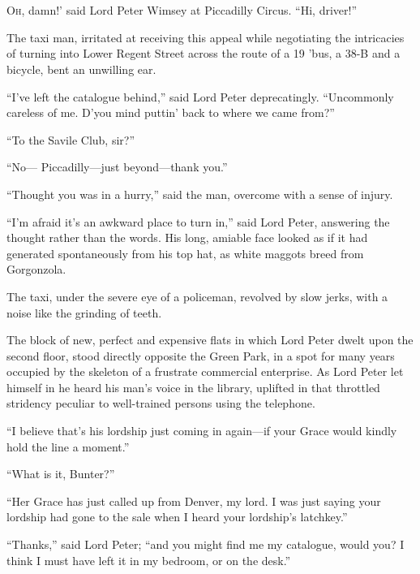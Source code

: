 \chapter[Chapter \thechapter]{}
\lettrine[lines=4,ante=‘]{O}{h}, damn!' said Lord Peter Wimsey at Piccadilly Circus. \enquote{Hi, driver!}

\zz
The taxi man, irritated at receiving this appeal while negotiating the intricacies of turning into Lower Regent Street across the route of a 19 ’bus, a 38-B and a bicycle, bent an unwilling ear.

\enquote{I’ve left the catalogue behind,} said Lord Peter deprecatingly. \enquote{Uncommonly careless of me. D’you mind puttin’ back to where we came from?}

\enquote{To the Savile Club, sir?}

\enquote{No\allowbreak--- Piccadilly\allowbreak---\allowbreak just beyond\allowbreak---\allowbreak thank you.}

\enquote{Thought you was in a hurry,} said the man, overcome with a sense of injury.

\enquote{I’m afraid it’s an awkward place to turn in,} said Lord Peter, answering the thought rather than the words. His long, amiable face looked as if it had generated spontaneously from his top hat, as white maggots breed from Gorgonzola.

The taxi, under the severe eye of a policeman, revolved by slow jerks, with a noise like the grinding of teeth.

The block of new, perfect and expensive flats in which Lord Peter dwelt upon the second floor, stood directly opposite the Green Park, in a spot for many years occupied by the skeleton of a frustrate commercial enterprise. As Lord Peter let himself in he heard his man’s voice in the library, uplifted in that throttled stridency peculiar to well-trained persons using the telephone.

\enquote{I believe that’s his lordship just coming in again\allowbreak---\allowbreak if your Grace would kindly hold the line a moment.}

\enquote{What is it, Bunter?}

\enquote{Her Grace has just called up from Denver, my lord. I was just saying your lordship had gone to the sale when I heard your lordship’s latchkey.}

\enquote{Thanks,} said Lord Peter; \enquote{and you might find me my catalogue, would you? I think I must have left it in my bedroom, or on the desk.}

